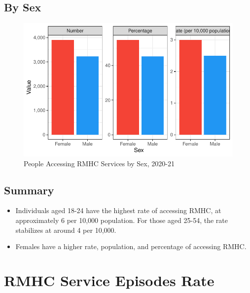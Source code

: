 \documentclass[
  a4paper,
  DIV=11,
  numbers=noendperiod]{scrreport}
\begin{document}
\hypertarget{by-sex-5}{%
\subsection{By Sex}\label{by-sex-5}}

\begin{figure}

\caption{\label{fig-rmhc-rs}People Accessing RMHC Services by Sex,
2020-21}

{\centering \includegraphics{./chap4-rmhc_files/figure-pdf/fig-rmhc-rs-1.pdf}

}

\end{figure}

\hypertarget{summary-6}{%
\subsection{Summary}\label{summary-6}}

\begin{itemize}
\item
  Individuals aged 18-24 have the highest rate of accessing RMHC, at
  approximately 6 per 10,000 population. For those aged 25-54, the rate
  stabilizes at around 4 per 10,000.
\item
  Females have a higher rate, population, and percentage of accessing
  RMHC.
\end{itemize}

\hypertarget{rmhc-service-episodes-rate}{%
\section{RMHC Service Episodes Rate}\label{rmhc-service-episodes-rate}}
\end{document}

